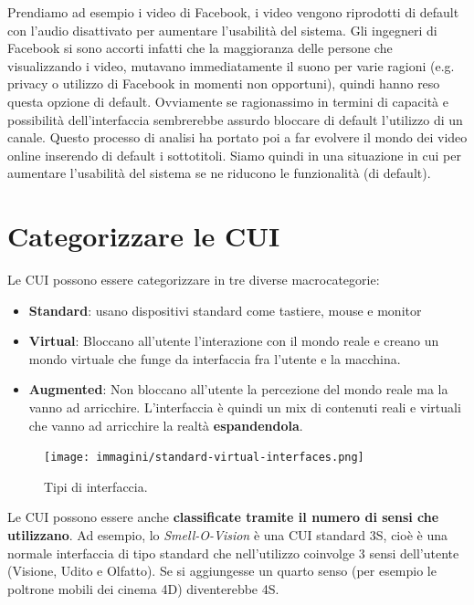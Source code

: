 Prendiamo ad esempio i video di
Facebook, i video vengono riprodotti di default con l'audio disattivato per aumentare l'usabilità del sistema.
Gli ingegneri di Facebook si sono accorti infatti che la maggioranza delle persone che visualizzando i video, mutavano immediatamente il suono per
varie ragioni (e.g. privacy o utilizzo di Facebook in momenti non opportuni), quindi hanno reso questa opzione di default. Ovviamente se ragionassimo
in termini di capacità e possibilità dell'interfaccia sembrerebbe assurdo bloccare di default l'utilizzo di un canale.
Questo processo di analisi ha portato poi a far evolvere il mondo dei video online inserendo di default i sottotitoli. Siamo quindi in una situazione in
cui per aumentare l'usabilità del sistema se ne riducono le funzionalità (di default).



\section{Categorizzare le CUI}
Le CUI possono essere categorizzare in tre diverse macrocategorie:

\begin{itemize}
	\itemsep-0.3em
	\item \textbf{Standard}: usano dispositivi standard come tastiere, mouse e monitor
	\item \textbf{Virtual}: Bloccano all'utente l'interazione con il mondo reale e creano un mondo virtuale che funge da interfaccia fra l'utente e
	la macchina.
	\item \textbf{Augmented}: Non bloccano all'utente la percezione del mondo reale ma la vanno ad arricchire. L'interfaccia è quindi un mix di
	contenuti reali e virtuali che vanno ad arricchire la realtà \textbf{espandendola}.
\end{itemize}

\begin{figure}[!h]
	\centering
	\texttt{[image: immagini/standard-virtual-interfaces.png]}
	\caption{Tipi di interfaccia.}
\end{figure}

Le CUI possono essere anche \textbf{classificate tramite il numero di sensi che utilizzano}. Ad esempio, lo \textit{Smell-O-Vision} è una CUI
standard 3S, cioè è una normale interfaccia di tipo standard che nell'utilizzo coinvolge 3 sensi dell'utente (Visione, Udito e Olfatto). Se si
aggiungesse un quarto senso (per esempio le poltrone mobili dei cinema 4D) diventerebbe 4S.

